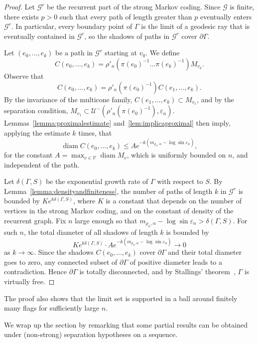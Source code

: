 \documentclass{amsart}
\DeclareMathOperator{\diam}{diam}
\theoremstyle{remark}
\theoremstyle{definition}
\begin{document}
\begin{proof}
Let $\mathcal{G}^r$ be the recurrent part of the strong Markov coding. 
Since $\mathcal{G}$ is finite, there exists $p > 0$ such that every path 
of length greater than $p$ eventually enters $\mathcal{G}^r$. In particular, 
every boundary point of $\Gamma$ is the limit of a geodesic ray that is 
eventually contained in $\mathcal{G}^r$, so the shadows of paths in 
$\mathcal{G}^r$ cover $\partial\Gamma$.

Let $(e_0,\ldots,e_k)$ be a path in $\mathcal{G}^r$ starting at $v_0$. 
We define 
$$C(e_0,\ldots,e_k) = \rho'_n(\pi(e_0)^{-1}\ldots\pi(e_k)^{-1})M_{v_k}.$$
Observe that 
$$C(e_0,\ldots,e_k) = \rho'_n(\pi(e_0)^{-1}) C(e_1,\ldots,e_k).$$
By the invariance of the multicone family, $C(e_1,\ldots,e_k) \subset M_{v_1}$, 
and by the separation condition, $M_{v_1} \subset \mathcal{U}^-(\rho'_n(\pi(e_0)^{-1}),\varepsilon_n)$.
Lemmas~\ref{lemma:proximalestimate} and~\ref{lem:implicaproximal} then imply, applying the estimate $k$ times, that 
$$\diam C(e_0,\ldots,e_k) \leq Ae^{-k(m_{\rho_n,\alpha} - \log\sin\varepsilon_n)},$$
for the constant $A = \max_{v \in \mathcal{V}} \diam M_{v}$, which is uniformly bounded on $n$, and independent of the path.

Let $\delta(\Gamma, S)$ be the exponential growth rate of $\Gamma$ with respect to $S$. By Lemma~\ref{lemma:densityandfiniteness}, the number of paths of length $k$ 
in $\mathcal{G}^r$ is bounded by $Ke^{k\delta(\Gamma,S)}$, where $K$ is a constant that depends on the number of vertices in the strong Markov coding, and on the constant of density of the recurrent graph.
Fix $n$ large enough so that $m_{\rho_n,\alpha} - \log\sin\varepsilon_n > \delta(\Gamma,S)$.
For such $n$, the total diameter of all shadows of length $k$ is bounded by
$$Ke^{k\delta(\Gamma,S)} \cdot Ae^{-k(m_{\rho_n,\alpha} - \log\sin\varepsilon_n)} \to 0$$
as $k \to \infty$. Since the shadows $C(e_0,\ldots,e_k)$ cover $\partial\Gamma$ 
and their total diameter goes to zero, any connected subset of $\partial\Gamma$ 
of positive diameter leads to a contradiction. Hence $\partial\Gamma$ is totally 
disconnected, and by Stallings' theorem~\cite{stallings1968torsion}, $\Gamma$ is virtually free.
\end{proof}

The proof also shows that the limit set is supported in a ball around finitely many flags for sufficiently large $ n$.

We wrap up the section by remarking that some partial results can be obtained under (non-strong) separation hypotheses on a sequence.
\end{document}
